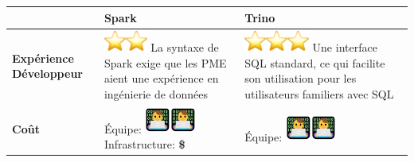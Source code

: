 \begin{longtable}{|p{0.23\linewidth}|p{0.35\linewidth}|p{0.42\linewidth}|}
\hline
\textbf{} & \textbf{Spark} & \textbf{Trino} \\ \hline
\textbf{Expérience \newline Développeur} & 
\includegraphics[width=0.28in,height=0.28in]{images/image3.png}\includegraphics[width=0.28in,height=0.28in]{images/image3.png}\newline
La syntaxe de Spark exige que les PME aient une expérience en ingénierie de données &
\includegraphics[width=0.28in,height=0.28in]{images/image3.png}\includegraphics[width=0.28in,height=0.28in]{images/image3.png}\includegraphics[width=0.28in,height=0.28in]{images/image3.png}\newline
Une interface SQL standard, ce qui facilite son utilisation pour les utilisateurs familiers avec SQL \\ \hline
\textbf{Coût} & 
Équipe: \includegraphics[width=0.33in,height=0.35in]{images/image4.jpg}\includegraphics[width=0.33in,height=0.35in]{images/image4.jpg}\newline
Infrastructure: \textcolor[RGB]{0, 128, 0}{\textbf{\large \$}} & 
Équipe: \includegraphics[width=0.33in,height=0.35in]{images/image4.jpg}\includegraphics[width=0.33in,height=0.35in]{images/image4.jpg}\newline

\end{longtable}
